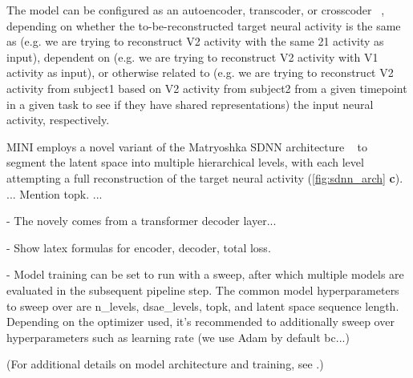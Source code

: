 The model can be configured as an autoencoder, transcoder, or crosscoder ~\cite{lindsey_2024_crosscoders}, depending on whether the to-be-reconstructed target neural activity is the same as (e.g. we are trying to reconstruct V2 activity with the same 21 activity as input), dependent on (e.g. we are trying to reconstruct V2 activity with V1 activity as input), or otherwise related to (e.g. we are trying to reconstruct V2 activity from subject1 based on V2 activity from subject2 from a given timepoint in a given task to see if they have shared representations) the input neural activity, respectively.

MINI employs a novel variant of the Matryoshka SDNN architecture ~\cite{bussman_2025_msae} to segment the latent space into multiple hierarchical levels, with each level attempting a full reconstruction of the target neural activity (\autoref{fig:sdnn_arch} \textbf{c}). ... Mention topk. ...

- The novely comes from a transformer decoder layer...

- Show latex formulas for encoder, decoder, total loss.

- Model training can be set to run with a sweep, after which multiple models are evaluated in the subsequent pipeline step. The common model hyperparameters to sweep over are n\_levels, dsae\_levels, topk, and latent space sequence length. Depending on the optimizer used, it's recommended to additionally sweep over hyperparameters such as learning rate (we use Adam by default bc...)

(For additional details on model architecture and training, see .)


